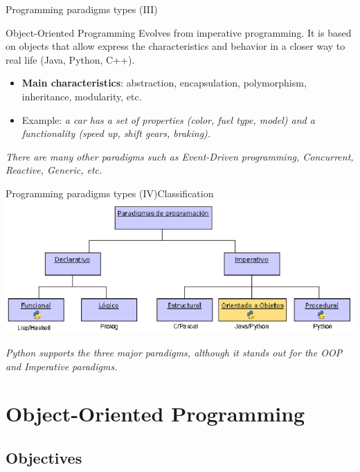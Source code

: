 \documentclass[10pt,compress]{beamer} %
\begin{document}
\begin{frame}{Programming paradigms types (III)}{}
	\begin{block}{Object-Oriented Programming}
		Evolves from imperative programming. It is based on \alert{objects} that allow express the \alert{characteristics} and \alert{behavior} in a closer way to real life (Java, Python, C++). 
  	\end{block}
  	\begin{itemize}
  		\item \textbf{Main characteristics}: abstraction, encapsulation, polymorphism, inheritance, modularity, etc.
		\item Example: \textit{a car has a set of properties (color, fuel type, model) and a functionality (speed up, shift gears, braking).} 
  	\end{itemize}
  	
\textit{\alert{There are many other paradigms such as Event-Driven programming, Concurrent, Reactive, Generic, etc.}}
\end{frame}

\begin{frame}{Programming paradigms types (IV)}{Classification}
	\includegraphics[scale=0.4]{figs/paradigmas}
	
	\centering\textit{\alert{Python supports the three major paradigms, although it stands out for the OOP and Imperative paradigms.}
}\end{frame}

\section[Object-Oriented Programming]{Object-Oriented Programming}

\subsection{Objectives}
\end{document}
